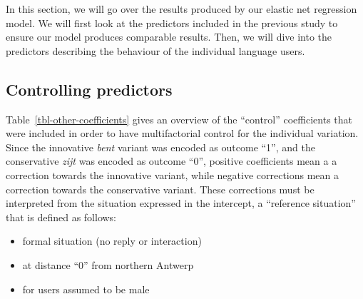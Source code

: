 \documentclass[
  letterpaper,
  DIV=11,
  numbers=noendperiod,
  oneside]{scrartcl}
\providecommand{\tightlist}{%
  \setlength{\itemsep}{0pt}\setlength{\parskip}{0pt}}\usepackage{longtable,booktabs,array}
\begin{document}
In this section, we will go over the results produced by our elastic net
regression model. We will first look at the predictors included in the
previous study to ensure our model produces comparable results. Then, we
will dive into the predictors describing the behaviour of the individual
language users.

\subsection{Controlling predictors}\label{sec-controlling-predictors}

Table~\ref{tbl-other-coefficients} gives an overview of the ``control''
coefficients that were included in order to have multifactorial control
for the individual variation. Since the innovative \emph{bent} variant
was encoded as outcome ``1'', and the conservative \emph{zijt} was
encoded as outcome ``0'', positive coefficients mean a a correction
towards the innovative variant, while negative corrections mean a
correction towards the conservative variant. These corrections must be
interpreted from the situation expressed in the intercept, a ``reference
situation'' that is defined as follows:

\begin{itemize}
\tightlist
\item
  formal situation (no reply or interaction)
\item
  at distance ``0'' from northern Antwerp
\item
  for users assumed to be male
\end{itemize}
\end{document}
